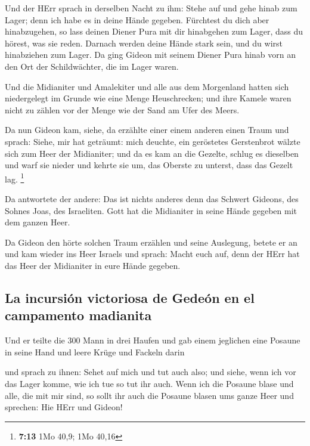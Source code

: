  Und der HErr sprach in derselben Nacht zu ihm: Stehe auf
und gehe hinab zum Lager; denn ich habe es in deine Hände gegeben.
 Fürchtest du dich aber hinabzugehen, so lass deinen
Diener Pura mit dir hinabgehen zum Lager,  dass du
hörest, was sie reden. Darnach werden deine Hände stark sein, und du
wirst hinabziehen zum Lager. Da ging Gideon mit seinem Diener Pura hinab
vorn an den Ort der Schildwächter, die im Lager waren.

 Und die Midianiter und Amalekiter und alle aus dem
Morgenland hatten sich niedergelegt im Grunde wie eine Menge
Heuschrecken; und ihre Kamele waren nicht zu zählen vor der Menge wie
der Sand am Ufer des Meers.

 Da nun Gideon kam, siehe, da erzählte einer einem
anderen einen Traum und sprach: Siehe, mir hat geträumt: mich deuchte,
ein geröstetes Gerstenbrot wälzte sich zum Heer der Midianiter; und da
es kam an die Gezelte, schlug es dieselben und warf sie nieder und
kehrte sie um, das Oberste zu unterst, dass das Gezelt lag. \footnote{\textbf{7:13}
  1Mo 40,9; 1Mo 40,16}

 Da antwortete der andere: Das ist nichts anderes denn
das Schwert Gideons, des Sohnes Joas, des Israeliten. Gott hat die
Midianiter in seine Hände gegeben mit dem ganzen Heer.

 Da Gideon den hörte solchen Traum erzählen und seine
Auslegung, betete er an und kam wieder ins Heer Israels und sprach:
Macht euch auf, denn der HErr hat das Heer der Midianiter in eure Hände
gegeben.

\hypertarget{la-incursiuxf3n-victoriosa-de-gedeuxf3n-en-el-campamento-madianita}{%
\subsection{La incursión victoriosa de Gedeón en el campamento
madianita}\label{la-incursiuxf3n-victoriosa-de-gedeuxf3n-en-el-campamento-madianita}}

 Und er teilte die 300 Mann in drei Haufen und gab einem
jeglichen eine Posaune in seine Hand und leere Krüge und Fackeln darin

 und sprach zu ihnen: Sehet auf mich und tut auch also;
und siehe, wenn ich vor das Lager komme, wie ich tue so tut ihr auch.
 Wenn ich die Posaune blase und alle, die mit mir sind,
so sollt ihr auch die Posaune blasen ums ganze Heer und sprechen: Hie
HErr und Gideon!

